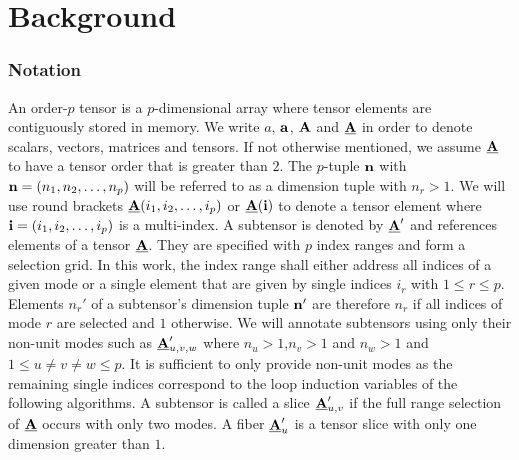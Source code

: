 \section{Background}
\label{sec:preliminaries}

\subsubsection{Notation}
\label{sec:preliminaries:notation}
An order-$p$ tensor is a $p$-dimensional array \cite{lim:2017:hypermatrices} where tensor elements are contiguously stored in memory. %
We write $a$, $\mathbf{a}$, $\mathbf{A}$ and $\underline{\mathbf{A}}$ in order to denote scalars, vectors, matrices and tensors. 
If not otherwise mentioned, we assume $\underline{\mathbf{A}}$ to have a tensor order that is greater than $2$.
The $p$-tuple $\mathbf{n}$ with $\mathbf{n} = (n_1,n_2,\dots,n_p)$ will be referred to as a dimension tuple with $n_r>1$.
We will use round brackets $\underline{\mathbf{A}}(i_1,i_2,\dots,i_p)$ or $\underline{\mathbf{A}}(\mathbf{i})$ to denote a tensor element where $\mathbf{i} = (i_1,i_2,\dots,i_p)$ is a multi-index.
A subtensor is denoted by $\underline{\mathbf{A}}'$ and references elements of a tensor $\underline{\mathbf{A}}$.
They are specified with $p$ index ranges and form a selection grid.
In this work, the index range shall either address all indices of a given mode or a single element that are given by single indices $i_r$ with $1 \leq r \leq p$. %
Elements $n_r'$ of a subtensor's dimension tuple $\mathbf{n}'$ are therefore $n_r$ if all indices of mode $r$ are selected and $1$ otherwise.
We will annotate subtensors using only their non-unit modes such as $\underline{\mathbf{A}}_{u,v,w}'$ where $n_u > 1$,$n_v > 1$ and $n_w >1$ and $1 \leq u \neq v \neq w \leq p$.
It is sufficient to only provide non-unit modes as the remaining single indices correspond to the loop induction variables of the following algorithms.
A subtensor is called a slice $\underline{\mathbf{A}}_{u,v}'$ if the full range selection of $\underline{\mathbf{A}}$ occurs with only two modes.
A fiber $\underline{\mathbf{A}}_u'$ is a tensor slice with only one dimension greater than $1$.
\vspace{-1em}

